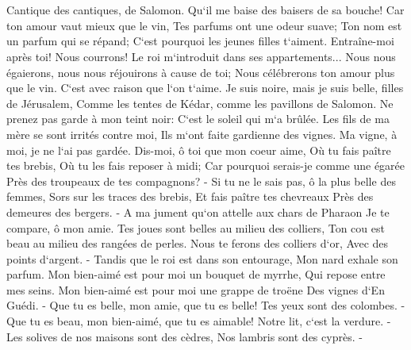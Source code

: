 

\chapter{}

\verse Cantique des cantiques, de Salomon. 
\verse Qu`il me baise des baisers de sa bouche! Car ton amour vaut mieux que le vin, 
\verse Tes parfums ont une odeur suave; Ton nom est un parfum qui se répand; C`est pourquoi les jeunes filles t`aiment. 
\verse Entraîne-moi après toi! Nous courrons! Le roi m`introduit dans ses appartements... Nous nous égaierons, nous nous réjouirons à cause de toi; Nous célébrerons ton amour plus que le vin. C`est avec raison que l`on t`aime. 
\verse Je suis noire, mais je suis belle, filles de Jérusalem, Comme les tentes de Kédar, comme les pavillons de Salomon. 
\verse Ne prenez pas garde à mon teint noir: C`est le soleil qui m`a brûlée. Les fils de ma mère se sont irrités contre moi, Ils m`ont faite gardienne des vignes. Ma vigne, à moi, je ne l`ai pas gardée. 
\verse Dis-moi, ô toi que mon coeur aime, Où tu fais paître tes brebis, Où tu les fais reposer à midi; Car pourquoi serais-je comme une égarée Près des troupeaux de tes compagnons? - 
\verse Si tu ne le sais pas, ô la plus belle des femmes, Sors sur les traces des brebis, Et fais paître tes chevreaux Près des demeures des bergers. - 
\verse A ma jument qu`on attelle aux chars de Pharaon Je te compare, ô mon amie. 
\verse Tes joues sont belles au milieu des colliers, Ton cou est beau au milieu des rangées de perles. 
\verse Nous te ferons des colliers d`or, Avec des points d`argent. - 
\verse Tandis que le roi est dans son entourage, Mon nard exhale son parfum. 
\verse Mon bien-aimé est pour moi un bouquet de myrrhe, Qui repose entre mes seins. 
\verse Mon bien-aimé est pour moi une grappe de troëne Des vignes d`En Guédi. - 
\verse Que tu es belle, mon amie, que tu es belle! Tes yeux sont des colombes. - 
\verse Que tu es beau, mon bien-aimé, que tu es aimable! Notre lit, c`est la verdure. - 
\verse Les solives de nos maisons sont des cèdres, Nos lambris sont des cyprès. - 

\chapter{}

